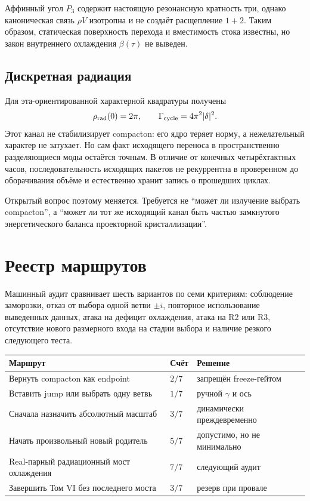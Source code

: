 Аффинный угол $P_3$ содержит настоящую резонансную кратность три, однако
каноническая связь $\rho V$ изотропна и не создаёт расщепление $1+2$.
Таким образом, статическая поверхность перехода и вместимость стока
известны, но закон внутреннего охлаждения $\beta(\tau)$ не выведен.

\subsection{Дискретная радиация}

Для эта-ориентированной характерной квадратуры получены
\begin{equation}
 \rho_{\rm rad}(0)=2\pi,
 \qquad
 \Gamma_{\rm cycle}=4\pi^2|\delta|^2.
 \label{eq:v6-post-compacton-radiation-law}
\end{equation}
Этот канал не стабилизирует compacton: его ядро теряет норму, а
нежелательный характер не затухает. Но сам факт исходящего переноса в
пространственно разделяющиеся моды остаётся точным. В отличие от конечных
четырёхтактных часов, последовательность исходящих пакетов не рекуррентна
в проверенном до оборачивания объёме и естественно хранит запись о
прошедших циклах.

Открытый вопрос поэтому меняется. Требуется не ``может ли излучение
выбрать compacton'', а ``может ли тот же исходящий канал быть частью
замкнутого энергетического баланса проекторной кристаллизации''.

\section{Реестр маршрутов}

Машинный аудит сравнивает шесть вариантов по семи критериям: соблюдение
заморозки, отказ от выбора одной ветви $\pm i$, повторное использование
выведенных данных, атака на дефицит охлаждения, атака на R2 или R3,
отсутствие нового размерного входа на стадии выбора и наличие резкого
следующего теста.

\begin{center}
\begin{tabular}{>{\raggedright\arraybackslash}p{}
                  >{\raggedright\arraybackslash}p{}
                  >{\raggedright\arraybackslash}p{}}
\toprule
Маршрут & Счёт & Решение \\
\midrule
Вернуть compacton как endpoint & $2/7$ & запрещён freeze-гейтом \\
Вставить jump или выбрать одну ветвь & $1/7$ & ручной $\gamma$ и ось \\
Сначала назначить абсолютный масштаб & $3/7$ & динамически преждевременно \\
Начать произвольный новый родитель & $5/7$ & допустимо, но не минимально \\
Real-парный радиационный мост охлаждения & $7/7$ & следующий аудит \\
Завершить Том VI без последнего моста & $3/7$ & резерв при провале \\
\bottomrule
\end{tabular}
\end{center}

